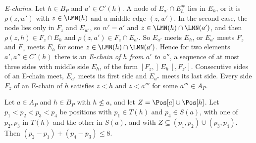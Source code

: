 \emph{E-chains.}
Let $h \in B_P$ and $a' \in C'(h)$.
A node of $E_{a'} \cap E^\#_h$ lies in $E_h$, or it is $\rho(z, w')$ with $z \in \LMN(h)$ and a middle edge $(z, w')$.
In the second case, the node lies only in $F_z$ and $E_{w'}$, so $w' = a'$ and $z \in \LMN(h) \cap \LMN(a')$, and then $\rho(z, h) \in F_z \cap E_h$ and $\rho(z, a') \in F_z \cap E_{a'}$.
So $E_{a'}$ meets $E_h$, or $E_{a'}$ meets $F_z$ and $F_z$ meets $E_h$ for some $z \in \LMN(h) \cap \LMN(a')$.
Hence for two elements $a', a'' \in C'(h)$ there is an \emph{E-chain of $h$ from $a'$ to $a''$}, a sequence of at most three sides with middle side $E_h$, of the form $[F_z,]\, E_h\, [, F_{z'}]$.
Consecutive sides of an E-chain meet, $E_{a'}$ meets its first side and $E_{a''}$ meets its last side.
Every side $F_z$ of an E-chain of $h$ satisfies $z < h$ and $z < a'''$ for some $a''' \in A_P$.

\begin{lemma}
\label{lem:pa-two-jumps}
Let $a \in A_P$ and $h \in B_P$ with $h \not\leq a$, and let $Z = \Pos[a] \cup \Pos[h]$.
Let $p_1 < p_2 < p_3 < p_4$ be positions with $p_1 \in T(h)$ and $p_4 \in S(a)$, with one of $p_2, p_3$ in $T(h)$ and the other in $S(a)$, and with $Z \subseteq (p_1, p_2) \cup (p_3, p_4)$.
Then $(p_2 - p_1) + (p_4 - p_3) \leq 8$.
\end{lemma}

